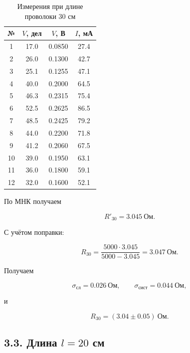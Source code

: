 \documentclass[12pt,a4paper]{article}
\begin{document}
\begin{table}[H]
\centering
\caption{Измерения при длине проволоки 30 см}
\begin{tabular}{c|c|c|c}
\toprule
№ & $V$, дел & $V$, В & $I$, мА\\
\midrule
1&17.0&0.0850&27.4\\
2&26.0&0.1300&42.7\\
3&25.1&0.1255&47.1\\
4&40.0&0.2000&64.5\\
5&46.3&0.2315&75.4\\
6&52.5&0.2625&86.5\\
7&48.5&0.2425&79.2\\
8&44.0&0.2200&71.8\\
9&41.2&0.2060&67.5\\
10&39.0&0.1950&63.1\\
11&36.0&0.1800&59.1\\
12&32.0&0.1600&52.1\\
\bottomrule
\end{tabular}
\end{table}

По МНК получаем

\begin{equation}
R'_{30}=3.045\ \text{Ом}.
\end{equation}

С учётом поправки:

\begin{equation}
R_{30}
=
\frac{5000\cdot3.045}{5000-3.045}
=
3.047\ \text{Ом}.
\end{equation}

Получаем

\begin{equation}
\sigma_{\text{сл}}
=
0.026\ \text{Ом},
\qquad
\sigma_{\text{сист}}
=
0.044\ \text{Ом},
\end{equation}

и

\begin{equation}
\boxed{
R_{30}=(3.04\pm0.05)\ \text{Ом}
}.
\end{equation}


\subsection*{3.3. Длина $l=20$ см}
\end{document}
